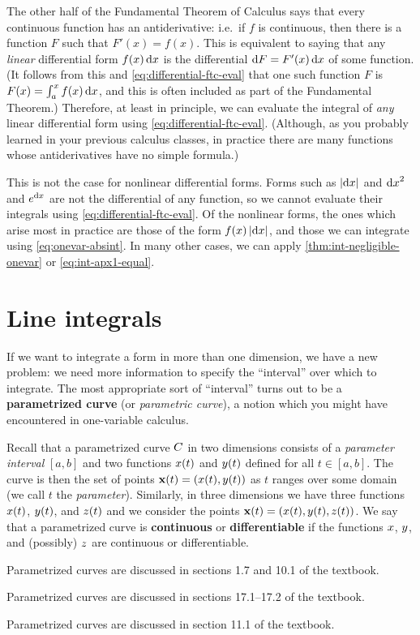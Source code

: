 The other half of the Fundamental Theorem of Calculus says that every continuous function has an antiderivative: i.e.\ if $f$ is continuous, then there is a function $F$ such that $F'(x) = f(x)$.
This is equivalent to saying that any \emph{linear} differential form $f(x)\,{\mathrm{d} x}$ is the differential $\mathrm{d} F = F'(x)\,{\mathrm{d} x}$ of some function.
(It follows from this and \cref{eq:differential-ftc-eval} that one such function $F$ is $F(x)= \int_a^x f(x)\,{\mathrm{d} x}$, and this is often included as part of the Fundamental Theorem.)
Therefore, at least in principle, we can evaluate the integral of \emph{any} linear differential form using \cref{eq:differential-ftc-eval}.
(Although, as you probably learned in your previous calculus classes, in practice there are many functions whose antiderivatives have no simple formula.)

This is not the case for nonlinear differential forms.
Forms such as $|{\mathrm{d} x}|$ and ${\mathrm{d} x}^2$ and $e^{\mathrm{d} x}$ are not the differential of any function, so we cannot evaluate their integrals using \cref{eq:differential-ftc-eval}.
Of the nonlinear forms, the ones which arise most in practice are those of the form $f(x)\,|{\mathrm{d} x}|$, and those we can integrate using \cref{eq:onevar-absint}.
In many other cases, we can apply \cref{thm:int-negligible-onevar} or \cref{eq:int-apx1-equal}.


\section{Line integrals}
\label{sec:line-integrals}

If we want to integrate a form in more than one dimension, we have a new problem: we need more information to specify the ``interval'' over which to integrate.
The most appropriate sort of ``interval'' turns out to be a \textbf{parametrized curve} (or \emph{parametric curve}), a notion which you might have encountered in one-variable calculus.

Recall that a parametrized curve $C$ in two dimensions consists of a \emph{parameter interval} $[a,b]$ and two functions $x(t)$ and $y(t)$ defined for all $t\in [a,b]$.
The curve is then the set of points $\mathbf{x}(t) = (x(t),y(t))$ as $t$ ranges over some domain (we call $t$ the \emph{parameter}).
Similarly, in three dimensions we have three functions $x(t)$, $y(t)$, and $z(t)$ and we consider the points $\mathbf{x}(t) = (x(t),y(t),z(t))$.
We say that a parametrized curve is \textbf{continuous} or \textbf{differentiable} if the functions $x$, $y$, and (possibly) $z$ are continuous or differentiable.
\begin{stewart}Parametrized curves are discussed in sections 1.7 and 10.1 of the textbook.\end{stewart}%
\begin{hugheshallett}Parametrized curves are discussed in sections 17.1--17.2 of the textbook.\end{hugheshallett}%
\begin{rogawski}Parametrized curves are discussed in section 11.1 of the textbook.\end{rogawski}%

